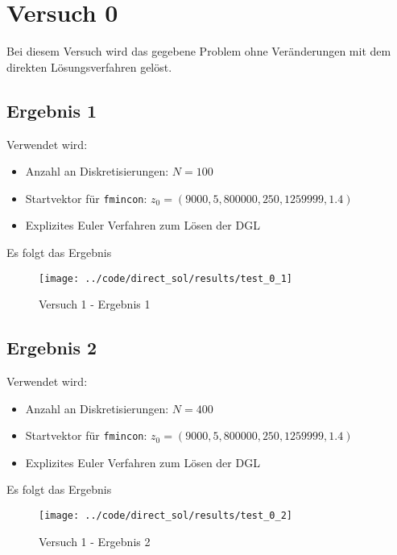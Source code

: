 \newpage
\section{Versuch 0}\label{kap:Versuch0}
Bei diesem Versuch wird das gegebene Problem ohne Veränderungen mit dem direkten Lösungsverfahren gelöst.

\subsection{Ergebnis 1}\label{kap:Versuch01}
Verwendet wird:
\begin{itemize}
\item Anzahl an Diskretisierungen: $N = 100$ 
\item Startvektor für \texttt{fmincon}: $z_0 = (9000,5,800000,250,1259999,1.4)$
\item Explizites Euler Verfahren zum Lösen der DGL
\end{itemize}
Es folgt das Ergebnis
\begin{figure}[H]
\begin{center}
\texttt{[image: ../code/direct\_sol/results/test\_0\_1]}
\caption{Versuch 1 - Ergebnis 1}\label{img:test_0_1}
\end{center}
\end{figure}

\newpage
\subsection{Ergebnis 2}\label{kap:Versuch02}
Verwendet wird:
\begin{itemize}
\item Anzahl an Diskretisierungen: $N = 400$ 
\item Startvektor für \texttt{fmincon}: $z_0 = (9000,5,800000,250,1259999,1.4)$
\item Explizites Euler Verfahren zum Lösen der DGL
\end{itemize}
Es folgt das Ergebnis
\begin{figure}[H]
\begin{center}
\texttt{[image: ../code/direct\_sol/results/test\_0\_2]}
\caption{Versuch 1 - Ergebnis 2}\label{img:test_0_2}
\end{center}
\end{figure}














